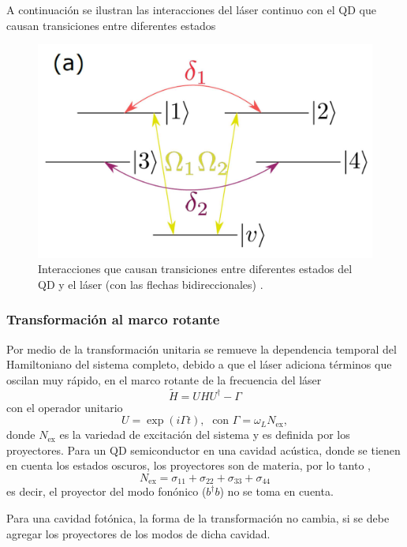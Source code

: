 \documentclass[main.tex]{subfiles}
\begin{document}
A continuación se ilustran las interacciones del láser continuo con el QD que causan transiciones entre diferentes estados
\begin{figure}[th]
	\centering
	\includegraphics[width=0.35\linewidth]{img/pumpLaser}
	\caption{Interacciones que causan transiciones entre diferentes estados del QD y el láser (con las flechas bidireccionales) \parencite{Vargas2022}.}
	\label{fig:pumplaser}
\end{figure}

\subsubsection{Transformación al marco rotante}
Por medio de la transformación unitaria se remueve la dependencia temporal del Hamiltoniano del sistema completo, debido a que el láser adiciona términos que oscilan muy rápido, en el marco rotante de la frecuencia del láser 
\begin{equation}
	\tilde{H} = UHU^\dagger - \Gamma
\end{equation}
con el operador unitario
\begin{equation}
	U = \exp(i \Gamma t),\; \text{ con } \Gamma = \omega_L N_\text{ex},
\end{equation}
donde $N_\text{ex}$ es la variedad de excitación del sistema y es definida por los proyectores. Para un QD semiconductor en una cavidad acústica, donde se tienen en cuenta los estados oscuros, los proyectores son de materia, por lo tanto \parencite{Vargas2022},
\begin{equation}
	N_\text{ex} = \sigma_{11} + \sigma_{22} + \sigma_{33} + \sigma_{44}
\end{equation}
es decir, el proyector del modo fonónico ($b^\dagger b$) no se toma en cuenta.

Para una cavidad fotónica, la forma de la transformación no cambia, si se debe agregar los proyectores de los modos de dicha cavidad.
\end{document}
